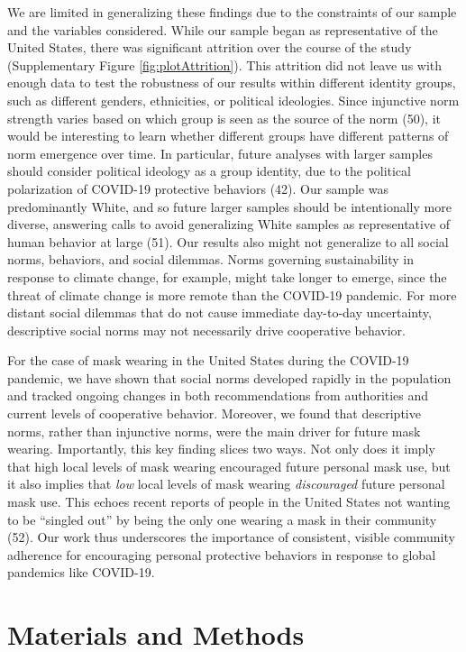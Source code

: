 \documentclass[
  man, donotrepeattitle,floatsintext]{apa6}
\begin{document}
We are limited in generalizing these findings due to the constraints of our sample and the variables considered. While our sample began as representative of the United States, there was significant attrition over the course of the study (Supplementary Figure \ref{fig:plotAttrition}). This attrition did not leave us with enough data to test the robustness of our results within different identity groups, such as different genders, ethnicities, or political ideologies. Since injunctive norm strength varies based on which group is seen as the source of the norm (50), it would be interesting to learn whether different groups have different patterns of norm emergence over time. In particular, future analyses with larger samples should consider political ideology as a group identity, due to the political polarization of COVID-19 protective behaviors (42). Our sample was predominantly White, and so future larger samples should be intentionally more diverse, answering calls to avoid generalizing White samples as representative of human behavior at large (51). Our results also might not generalize to all social norms, behaviors, and social dilemmas. Norms governing sustainability in response to climate change, for example, might take longer to emerge, since the threat of climate change is more remote than the COVID-19 pandemic. For more distant social dilemmas that do not cause immediate day-to-day uncertainty, descriptive social norms may not necessarily drive cooperative behavior.

For the case of mask wearing in the United States during the COVID-19 pandemic, we have shown that social norms developed rapidly in the population and tracked ongoing changes in both recommendations from authorities and current levels of cooperative behavior. Moreover, we found that descriptive norms, rather than injunctive norms, were the main driver for future mask wearing. Importantly, this key finding slices two ways. Not only does it imply that high local levels of mask wearing encouraged future personal mask use, but it also implies that \emph{low} local levels of mask wearing \emph{discouraged} future personal mask use. This echoes recent reports of people in the United States not wanting to be ``singled out'' by being the only one wearing a mask in their community (52). Our work thus underscores the importance of consistent, visible community adherence for encouraging personal protective behaviors in response to global pandemics like COVID-19.

\hypertarget{materials-and-methods}{%
\section{Materials and Methods}\label{materials-and-methods}}
\end{document}
